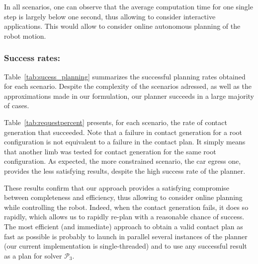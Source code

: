 In all scenarios, one can observe that the average computation time for one single step is largely below one second,
thus allowing to consider \gls{interactive} applications. This would allow to consider online autonomous planning of the robot motion.


\subsubsection{Success rates:}
Table~\ref{tab:sucess_planning} summarizes the successful planning rates obtained for each scenario.
Despite the complexity of the scenarios adressed, as well as the approximations made in our formulation, our planner succeeds in a large majority of cases.

Table~\ref{tab:requestpercent} presents, for each scenario, the rate of contact generation that succeeded. Note that a failure in contact generation for a root configuration is not equivalent to a failure in the contact plan. It simply means that another limb was tested for contact generation for the same root configuration.
As expected, the more constrained scenario, the car egress one, provides the less satisfying results, despite the high success rate of the planner.

These results confirm that our approach provides a satisfying compromise between completeness and efficiency, thus allowing to consider online planning
while controlling the robot.
Indeed, when the contact generation fails, it does so rapidly, which allows us to rapidly re-plan with a reasonable chance of success.
The most efficient (and immediate) approach to obtain a valid contact plan as fast as possible is probably to launch in parallel several instances of the planner (our current implementation is single-threaded) and to use any successful result as a plan for solver $\mathcal{P}_3$.


